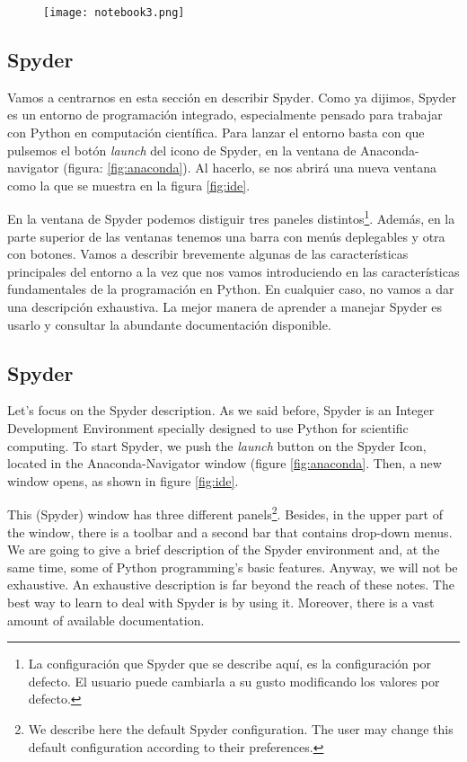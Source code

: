 \begin{figure}
\centering
    \texttt{[image: notebook3.png]}
    \label{fig:ntb3}
\end{figure} 

\begin{paracol}{2}
\subsection{Spyder}
Vamos a centrarnos en esta sección en describir Spyder. Como ya dijimos, Spyder es un entorno de programación integrado, especialmente pensado para trabajar con Python en computación científica. Para lanzar el entorno basta con que pulsemos el botón \emph{launch} del icono de Spyder, en la ventana de Anaconda-navigator (figura: \ref{fig:anaconda}). Al hacerlo, se nos abrirá una nueva ventana como la que se muestra en la figura \ref{fig:ide}.

En la ventana de Spyder podemos distiguir tres paneles distintos\footnote{La configuración que Spyder que se describe  aquí, es la configuración por defecto. El usuario puede cambiarla a su gusto modificando los valores por defecto.}. Además, en la  parte superior de las ventanas tenemos una barra con menús deplegables y otra con botones. Vamos a describir brevemente algunas de las características principales del entorno a la vez que nos vamos introduciendo en las características fundamentales de la programación en Python. En cualquier caso, no vamos a dar una descripción exhaustiva. La mejor manera de aprender a manejar Spyder es usarlo y consultar la abundante documentación disponible.
\switchcolumn

\subsection{Spyder}
Let's focus on the Spyder description. As we said before, Spyder is an Integer Development Environment specially designed to use Python for scientific computing. To start Spyder, we push the \emph{launch} button on the Spyder Icon, located in the Anaconda-Navigator window (figure \ref{fig:anaconda}. Then, a new window opens, as shown in figure \ref{fig:ide}.

This (Spyder) window has three different panels\footnote{We describe here the default Spyder configuration. The user may change this default configuration according to their preferences.}. Besides, in the upper part of the window, there is a toolbar and a second bar that contains drop-down menus. We are going to give a brief description of the Spyder environment and, at the same time, some of Python programming's basic features. Anyway, we will not be exhaustive. An exhaustive description is far beyond the reach of these notes. The best way to learn to deal with Spyder is by using it. Moreover, there is a vast amount of available documentation.
\end{paracol}

